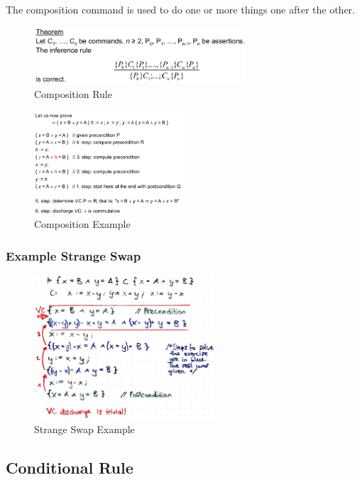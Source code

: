 The composition command is used to do one or more things one after the
other.

\begin{figure}[H]
\centering
\includegraphics[width=0.7\textwidth]{figures/compositionrule.png}
\caption{Composition Rule}
\end{figure}

\begin{figure}[H]
\centering
\includegraphics[width=0.5\textwidth]{figures/compositionExample.png}
\caption{Composition Example}
\end{figure}

\hypertarget{example-strange-swap}{%
\subsubsection{Example Strange Swap}\label{example-strange-swap}}

\begin{figure}[H]
\centering
\includegraphics[width=0.6\textwidth]{figures/exampleStrangeSwap.png}
\caption{Strange Swap Example}
\end{figure}

\hypertarget{conditional-rule}{%
\subsection{Conditional Rule}\label{conditional-rule}}

